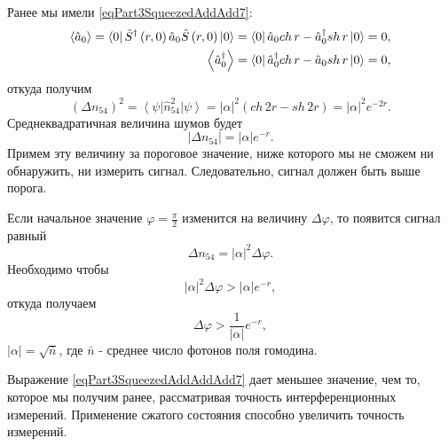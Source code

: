 Ранее мы имели \eqref{eqPart3SqueezedAddAdd7}:
\begin{eqnarray}
\left<\hat{a}_0\right> = 
\bra{0}
\hat{S}^{\dag}\left(r, 0\right)
\hat{a}_0
\hat{S}\left(r, 0\right)
\ket{0} = 
\bra{0}
\hat{a}_0 ch\,r - \hat{a}_0^{\dag} sh\,r
\ket{0} = 0,
\nonumber \\
\left<\hat{a}_0^{\dag}\right> = 
\bra{0}
\hat{a}_0^{\dag} ch\,r - \hat{a}_0 sh\,r
\ket{0} = 0,
\nonumber
\end{eqnarray}
откуда получим
\begin{equation}
\left(\Delta n_{54}\right)^2 = 
\left<\psi\right|\hat{n}_{54}^2\left|\psi\right> =
\left|\alpha\right|^2\left(
ch\,2r - sh\,2r
\right) = 
\left|\alpha\right|^2 e^{-2 r}.
\nonumber
\end{equation}
Среднеквадратичная величина шумов будет 
\[
\left|\Delta n_{54}\right| = 
\left|\alpha\right| e^{- r}.
\]
Примем эту величину за пороговое значение, ниже которого мы не сможем
ни обнаружить, ни измерить сигнал. Следовательно, сигнал должен быть
выше порога.

Если начальное значение $\varphi=\frac{\pi}{2}$ изменится на величину $\Delta
\varphi$, то появится сигнал равный
\[
\Delta n_{54} = 
\left|\alpha\right|^2
\Delta \varphi.
\]
Необходимо чтобы 
\[
\left|\alpha\right|^2
\Delta \varphi > 
\left|\alpha\right|
e^{-r},
\]
откуда получаем
\begin{equation}
\Delta \varphi >
\frac{1}{\left|\alpha\right|} e^{-r},
\label{eqPart3SqueezedAddAddAdd7}
\end{equation}
$\left|\alpha\right| = \sqrt{\bar{n}}$, где $\bar{n}$ - среднее число
фотонов поля гомодина.

Выражение \eqref{eqPart3SqueezedAddAddAdd7} дает меньшее значение, чем
то, которое мы получим ранее, рассматривая точность интерференционных
измерений. Применение сжатого состояния способно увеличить точность
измерений. 
